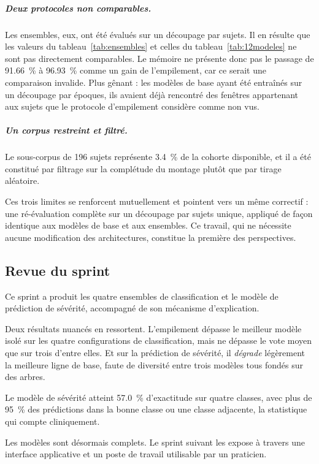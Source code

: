 \subparagraph{Deux protocoles non comparables.} Les ensembles, eux, ont été évalués sur un
découpage par sujets. Il en résulte que les valeurs du tableau~\ref{tab:ensembles} et
celles du tableau~\ref{tab:12modeles} ne sont pas directement comparables. Le
mémoire ne présente donc pas le passage de \SI{91,66}{\percent} à \SI{96,93}{\percent}
comme un gain de l'empilement, car ce serait une comparaison invalide. Plus gênant : les
modèles de base ayant été entraînés sur un découpage par époques, ils avaient déjà
rencontré des fenêtres appartenant aux sujets que le protocole d'empilement considère
comme non vus.

\subparagraph{Un corpus restreint et filtré.} Le sous-corpus de 196 sujets représente
\SI{3,4}{\percent} de la cohorte disponible, et il a été constitué par filtrage sur la
complétude du montage plutôt que par tirage aléatoire.

\medskip
\noindent
Ces trois limites se renforcent mutuellement et pointent vers un même correctif : une
ré-évaluation complète sur un découpage par sujets unique, appliqué de façon
identique aux modèles de base et aux ensembles. Ce travail, qui ne nécessite aucune
modification des architectures, constitue la première des perspectives.

\subsection{Revue du sprint}

Ce sprint a produit les quatre ensembles de classification et le modèle de prédiction de
sévérité, accompagné de son mécanisme d'explication.

Deux résultats nuancés en ressortent. L'empilement dépasse le meilleur modèle isolé sur
les quatre configurations de classification, mais ne dépasse le vote moyen que sur trois
d'entre elles. Et sur la prédiction de sévérité, il \emph{dégrade} légèrement la meilleure
ligne de base, faute de diversité entre trois modèles tous fondés sur des arbres.

Le modèle de sévérité atteint \SI{57,0}{\percent} d'exactitude sur quatre classes, avec
plus de \SI{95}{\percent} des prédictions dans la bonne classe ou une classe adjacente,
la statistique qui compte cliniquement.

Les modèles sont désormais complets. Le sprint suivant les expose à travers une interface
applicative et un poste de travail utilisable par un praticien.

